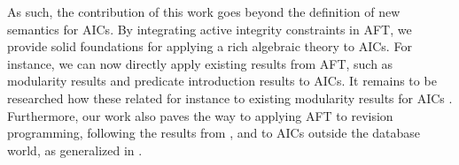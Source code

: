 
As such, the contribution of this work goes beyond the definition of new semantics for AICs. 
By integrating active integrity constraints in AFT, we provide solid foundations for applying a rich algebraic theory to AICs.
For instance, we can now directly apply existing results from AFT, such as modularity results and predicate introduction results to AICs. 
It remains to be researched how these related for instance to existing modularity results for AICs \cite{foiks/Cruz-Filipe14,iclp/Cruz-Filipe16}. 
Furthermore, our work also paves the way to applying AFT to revision programming, following the results from \citet{tplp/CaropreseT11}, and to AICs outside the database world, as generalized in \citet{ekaw/Cruz-Filipe16}.


